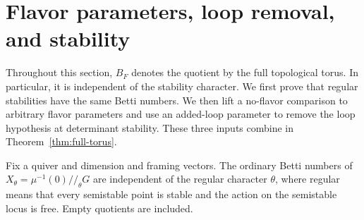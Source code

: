 \section{Flavor parameters, loop removal, and stability}
\label{sec:deformations}

Throughout this section, $B_F$ denotes the quotient by the full topological
torus.  In particular, it is independent of the stability character.
We first prove that regular stabilities have the same Betti numbers.
We then lift a no-flavor comparison to arbitrary flavor parameters and
use an added-loop parameter to remove the loop hypothesis at determinant
stability.  These three inputs combine in Theorem~\ref{thm:full-torus}.

\begin{lemma}\label{lem:betti-independence}
Fix a quiver and dimension and framing vectors.  The ordinary Betti numbers
of $X_\theta=\mu^{-1}(0)/\!/_{\theta}G$ are independent of the regular
character $\theta$, where regular means that every semistable point is stable
and the action on the semistable locus is free.  Empty quotients are included.
\end{lemma}

